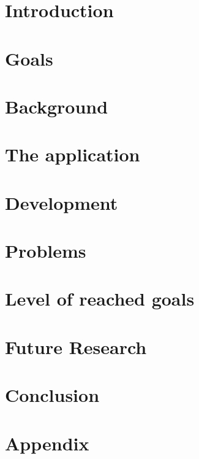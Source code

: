 \documentclass[a4paper]{article}
\begin{document}
\tableofcontents
\newpage

\section{Introduction}
\label{sec:introduction}



\section{Goals}
\label{sec:goals}


\section{Background}
\label{sec:background}


\section{The application}
\label{sec:application}


\section{Development}
\label{sec:development}


\section{Problems}
\label{sec:problems}


\section{Level of reached goals}
\label{sec:levelOfReachedGoals}


%

\section{Future Research}
\label{sec:futureResearch}


\section{Conclusion}
\label{sec:conclusion}


\newpage

%
%

\newpage
\section{Appendix}

\end{document}
